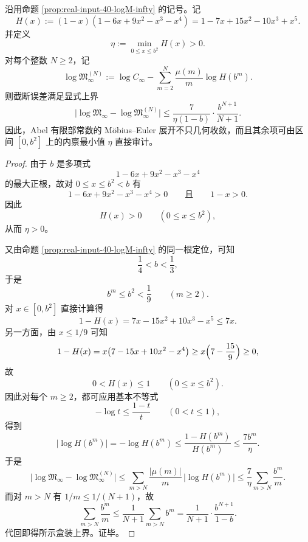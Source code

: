 \begin{theorem}\label{thm:xi-time-part57f-abel-finite-part-eta-tail}
沿用命题 \ref{prop:real-input-40-logM-infty} 的记号。记
\[
H(x):=(1-x)(1-6x+9x^2-x^3-x^4)
=
1-7x+15x^2-10x^3+x^5.
\]
并定义
\[
\eta:=\min_{0\le x\le b^2}H(x)>0.
\]
对每个整数 \(N\ge 2\)，记
\[
\log\mathfrak M_\infty^{(N)}
:=
\log C_\infty
-\sum_{m=2}^{N}\frac{\mu(m)}{m}\log H(b^m).
\]
则截断误差满足显式上界
\[
\boxed{\;
\bigl|\log\mathfrak M_\infty-\log\mathfrak M_\infty^{(N)}\bigr|
\le
\frac{7}{\eta(1-b)}\cdot \frac{b^{N+1}}{N+1}.\;}
\]
因此，Abel 有限部常数的 Möbius--Euler 展开不只几何收敛，而且其余项可由区间 \([0,b^2]\) 上的内禀最小值 \(\eta\) 直接审计。
\end{theorem}
\begin{proof}
由于 \(b\) 是多项式
\[
1-6x+9x^2-x^3-x^4
\]
的最大正根，故对 \(0\le x\le b^2<b\) 有
\[
1-6x+9x^2-x^3-x^4>0
\qquad\text{且}\qquad
1-x>0.
\]
因此
\[
H(x)>0
\qquad
(0\le x\le b^2),
\]
从而 \(\eta>0\)。

又由命题 \ref{prop:real-input-40-logM-infty} 的同一根定位，可知
\[
\frac14<b<\frac13,
\]
于是
\[
b^m\le b^2<\frac19
\qquad
(m\ge 2).
\]
对 \(x\in[0,b^2]\) 直接计算得
\[
1-H(x)=7x-15x^2+10x^3-x^5\le 7x.
\]
另一方面，由 \(x\le 1/9\) 可知
\[
1-H(x)
=
x\bigl(7-15x+10x^2-x^4\bigr)
\ge
x\Bigl(7-\frac{15}{9}\Bigr)\ge 0,
\]
故
\[
0<H(x)\le 1
\qquad
(0\le x\le b^2).
\]
因此对每个 \(m\ge 2\)，都可应用基本不等式
\[
-\log t\le \frac{1-t}{t}
\qquad
(0<t\le 1),
\]
得到
\[
\bigl|\log H(b^m)\bigr|
=
-\log H(b^m)
\le
\frac{1-H(b^m)}{H(b^m)}
\le
\frac{7b^m}{\eta}.
\]
于是
\[
\bigl|\log\mathfrak M_\infty-\log\mathfrak M_\infty^{(N)}\bigr|
\le
\sum_{m>N}\frac{|\mu(m)|}{m}\,\bigl|\log H(b^m)\bigr|
\le
\frac{7}{\eta}\sum_{m>N}\frac{b^m}{m}.
\]
而对 \(m>N\) 有 \(1/m\le 1/(N+1)\)，故
\[
\sum_{m>N}\frac{b^m}{m}
\le
\frac{1}{N+1}\sum_{m>N}b^m
=
\frac{1}{N+1}\cdot \frac{b^{N+1}}{1-b}.
\]
代回即得所示盒装上界。证毕。
\end{proof}

